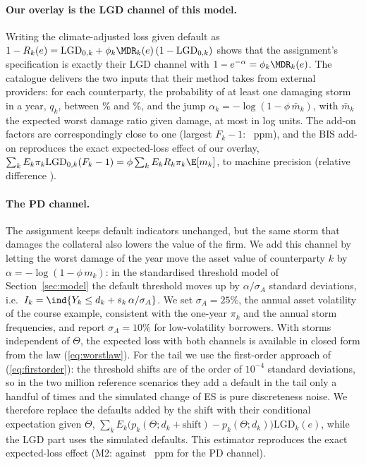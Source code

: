 \paragraph{Our overlay is the LGD channel of this model.}
Writing the climate-adjusted loss given default as $1-R_k(e)=\mathrm{LGD}_{0,k}+\phi_k\MDR_k(e)\,(1-\mathrm{LGD}_{0,k})$ shows that the assignment's specification is exactly their LGD channel with $1-e^{-\alpha}=\phi_k\MDR_k(e)$. The catalogue delivers the two inputs that their method takes from external providers: for each counterparty, the probability of at least one damaging storm in a year, $q_k$, between \% and \%, and the jump $\alpha_k=-\log(1-\phi\,\bar m_k)$, with $\bar m_k$ the expected worst damage ratio given damage, at most  in log units. The add-on factors are correspondingly close to one (largest $F_k-1$: ~ppm), and the BIS add-on reproduces the exact expected-loss effect of our overlay, $\sum_kE_k\pi_k\mathrm{LGD}_{0,k}(F_k-1)=\phi\sum_kE_kR_k\pi_k\E[m_k]$, to machine precision (relative difference ).

\paragraph{The PD channel.}
The assignment keeps default indicators unchanged, but the same storm that damages the collateral also lowers the value of the firm. We add this channel by letting the worst damage of the year move the asset value of counterparty $k$ by $\alpha=-\log(1-\phi\,m_k)$: in the standardised threshold model of Section~\ref{sec:model} the default threshold moves up by $\alpha/\sigma_A$ standard deviations, i.e.\ $I_k=\ind\{Y_k\le d_k+s_k\,\alpha/\sigma_A\}$. We set $\sigma_A=25\%$, the annual asset volatility of the course example, consistent with the one-year $\pi_k$ and the annual storm frequencies, and report $\sigma_A=10\%$ for low-volatility borrowers. With storms independent of $\Theta$, the expected loss with both channels is available in closed form from the law (\ref{eq:worstlaw}). For the tail we use the first-order approach of (\ref{eq:firstorder}): the threshold shifts are of the order of $10^{-4}$ standard deviations, so in the two million reference scenarios they add a default in the tail only a handful of times and the simulated change of ES is pure discreteness noise. We therefore replace the defaults added by the shift with their conditional expectation given $\Theta$, $\sum_kE_k\big(p_k(\Theta;d_k+\text{shift})-p_k(\Theta;d_k)\big)\mathrm{LGD}_k(e)$, while the LGD part uses the simulated defaults. This estimator reproduces the exact expected-loss effect (M2:  against ~ppm for the PD channel).

